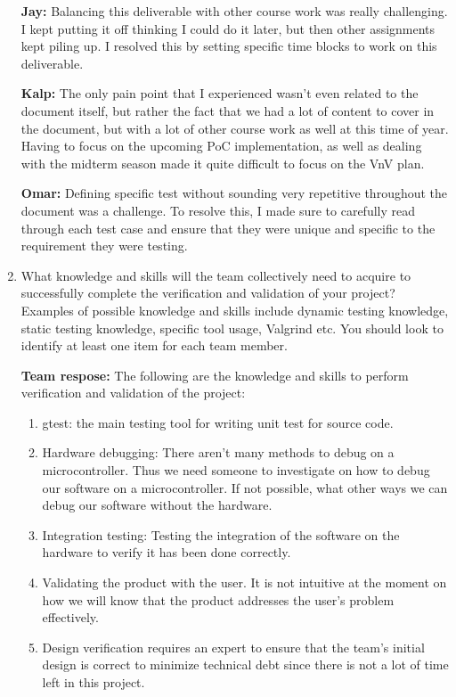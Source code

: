 \documentclass[12pt, titlepage]{article}
\begin{document}
\begin{enumerate}
  \textbf{Jay:} Balancing this deliverable with other course work was really
  challenging. I kept putting it off thinking I could do it later, but then
  other assignments kept piling up. I resolved this by setting specific time
  blocks to work on this deliverable.

  \textbf{Kalp:} The only pain point that I experienced wasn't even related to
  the document itself, but rather the fact that we had a lot of content to cover
  in the document, but with a lot of other course work as well at this time of
  year. Having to focus on the upcoming PoC implementation, as well as dealing
  with the midterm season made it quite difficult to focus on the VnV plan.

  \textbf{Omar:} Defining specific test without sounding very repetitive
  throughout the document was a challenge. To resolve this, I made sure to
  carefully read through each test case and ensure that they were unique and
  specific to the requirement they were testing.

  \item What knowledge and skills will the team collectively need to acquire to
  successfully complete the verification and validation of your project?
  Examples of possible knowledge and skills include dynamic testing knowledge,
  static testing knowledge, specific tool usage, Valgrind etc.  You should look
  to identify at least one item for each team member.
  
  \textbf{Team respose:} The following are the knowledge and skills to perform
  verification and validation of the project:

  \begin{enumerate}
    \item gtest: the main testing tool for writing unit test for source code.
    \item Hardware debugging: There aren't many methods to debug on a
    microcontroller. Thus we need someone to investigate on how to debug our
    software on a microcontroller. If not possible, what other ways we can debug
    our software without the hardware.
    \item Integration testing: Testing the integration of the software on the
    hardware to verify it has been done correctly.
    \item Validating the product with the user. It is not intuitive at the
    moment on how we will know that the product addresses the user's problem
    effectively.
    \item Design verification requires an expert to ensure that the team's
    initial design is correct to minimize technical debt since there is not a
    lot of time left in this project.
  \end{enumerate}


\end{enumerate}
\end{document}
